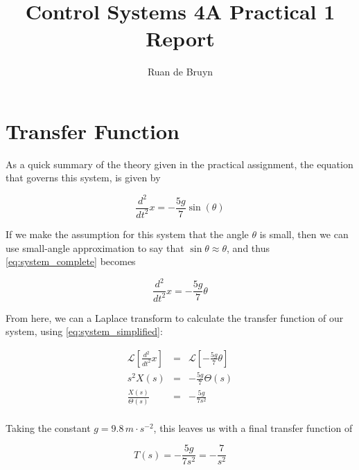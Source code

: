 \documentclass[a4paper, 12pt]{article}
\title{Control Systems 4A Practical 1 Report}
\author{Ruan de Bruyn}
\begin{document}
\begin{titlepage}
  \maketitle
\end{titlepage}

\tableofcontents
\newpage
{}

\section{Transfer Function}
	As a quick summary of the theory given in the practical assignment, the
	equation that governs this system, is given by

	\begin{equation}
	  \frac{d^2}{dt^2} x = -\frac{5g}{7} \sin(\theta)
	  \label{eq:system_complete}
	\end{equation}

	If we make the assumption for this system that the angle $\theta$ is small,
	then we can use small-angle approximation to say that $\sin \theta \approx
	\theta$, and thus \eqref{eq:system_complete} becomes

	\begin{equation}
	  \frac{d^2}{dt^2} x = -\frac{5g}{7} \theta
	  \label{eq:system_simplified}
	\end{equation}

	From here, we can a Laplace transform to calculate the transfer function of
	our system, using \eqref{eq:system_simplified}:

	\begin{equation*}
	  \begin{array}{rcl}
		\mathcal{L}\left[ \frac{d^2}{dt^2}x \right] & = & \mathcal{L}\left[ -\frac{5g}{7}\theta \right] \\
		s^2 X(s) & = & -\frac{5g}{7}\Theta(s) \\
		\frac{X(s)}{\Theta(s)}  & = & -\frac{5g}{7s^2} \\
	  \end{array}
	  \label{eq:transfer_function}
	\end{equation*}
	
	Taking the constant $g = 9.8 \, m \cdot s^{-2}$, this leaves us with a final transfer function of

	\begin{equation}
	  T(s) = -\frac{5g}{7s^2} = -\frac{7}{s^2}
	  \label{eq:tf_final}
	\end{equation}
\end{document}
